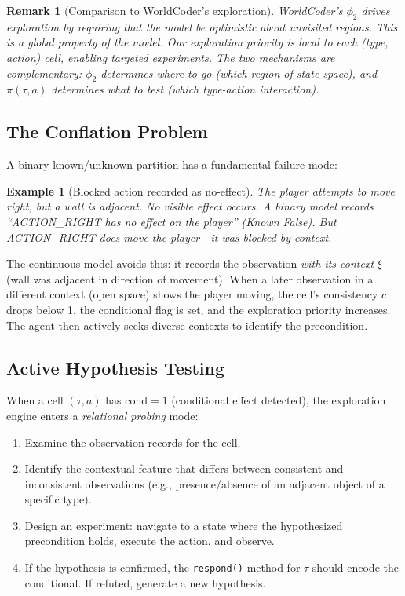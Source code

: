 \documentclass{article}
\newtheorem{remark}{Remark}
\newtheorem{example}{Example}
\begin{document}
\begin{remark}[Comparison to WorldCoder's exploration]
WorldCoder's $\phi_2$ drives exploration by requiring that the model be
optimistic about unvisited regions.  This is a global property of the
model.  Our exploration priority is \emph{local} to each (type, action) cell,
enabling targeted experiments.  The two mechanisms are complementary: $\phi_2$
determines \emph{where to go} (which region of state space), and $\pi(\tau, a)$
determines \emph{what to test} (which type-action interaction).
\end{remark}

\subsection{The Conflation Problem}
\label{sec:conflation}

A binary known/unknown partition has a fundamental failure mode:

\begin{example}[Blocked action recorded as no-effect]
\label{ex:conflation}
The player attempts to move right, but a wall is adjacent.  No visible effect
occurs.  A binary model records ``ACTION\_RIGHT has no effect on the player''
(Known False).  But ACTION\_RIGHT \emph{does} move the player---it was
blocked by context.
\end{example}

The continuous model avoids this: it records the observation \emph{with its
context} $\xi$ (wall was adjacent in direction of movement).  When a later
observation in a different context (open space) shows the player moving, the
cell's consistency $c$ drops below 1, the conditional flag is set, and the
exploration priority increases.  The agent then actively seeks diverse contexts
to identify the precondition.

\subsection{Active Hypothesis Testing}
\label{sec:hypothesis_testing}

When a cell $(\tau, a)$ has $\text{cond} = 1$ (conditional effect detected),
the exploration engine enters a \emph{relational probing} mode:

\begin{enumerate}[nosep]
    \item Examine the observation records for the cell.
    \item Identify the contextual feature that differs between consistent and
          inconsistent observations (e.g., presence/absence of an adjacent
          object of a specific type).
    \item Design an experiment: navigate to a state where the hypothesized
          precondition holds, execute the action, and observe.
    \item If the hypothesis is confirmed, the \texttt{respond()} method for
          $\tau$ should encode the conditional.  If refuted, generate a new
          hypothesis.
\end{enumerate}
\end{document}

